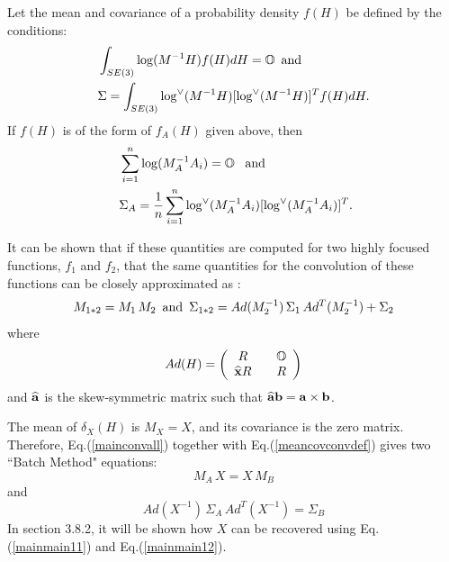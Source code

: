 \documentclass[twocolumn,10pt]{asme2ej}
\begin{document}
Let the mean and covariance of a probability density $f(H)$ be defined by the conditions:
\begin{equation} \begin{split} &\int_{SE(3)} \log(M^{-1} H) f(H) dH = \mathbb{O} \,\,\, {\rm and} \,\,\,\\ &\Sigma = \int_{SE(3)} \log^{\vee}(M^{-1} H) [\log^{\vee}(M^{-1} H)]^T  f(H) dH . \end{split}\label{meancovdef} \end{equation}
If $f(H)$ is of the form of $f_A(H)$ given above, then
\begin{equation} \
\begin{split} &\sum_{i=1}^{n} \log(M_A^{-1} A_i) = \mathbb{O} {\rm \,\,\,\,\, and} \\
&\Sigma_A = \frac{1}{n} \sum_{i=1}^{n} \log^{\vee}(M_A^{-1} A_i) [\log^{\vee}(M_A^{-1} A_i)]^T.  \label{datameancovconvdef} \end{split}
\end{equation}

It can be shown that if these quantities are computed for two highly focused functions, $f_1$ and $f_2$, that the same quantities for
the convolution of these functions can be closely approximated as \cite{Wang08}:
\begin{equation}
M_{1*2} = M_1 \, M_2 \,\,\, {\rm and} \,\,\, \Sigma_{1*2} = Ad(M_2^{-1}) \,\Sigma_{1}\, Ad^T(M_2^{-1}) + \Sigma_{2}
\label{meancovconvdef} \end{equation}
where
\begin{equation} 
Ad(H) = \left(\begin{array}{ccc}
R && \mathbb{O} \\
\widehat{{\bf x}} R && R \end{array}\right) 
\label{adjdef} \end{equation}
and $\widehat{{\bf a}}$ is the skew-symmetric matrix such that $\widehat{{\bf a}} {\bf b} = {\bf a} \times {\bf b}$.

The mean of $\delta_X(H)$ is $M_X = X$, and its covariance is the zero matrix.
Therefore, Eq.(\ref{mainconvall}) together with Eq.(\ref{meancovconvdef}) gives two ``Batch Method" equations:
\begin{equation}
\boxed{\,
M_A \, X = X \, M_B
\,}
\label{mainmain11} \end{equation}
and
\begin{equation}
\boxed{\,
Ad(X^{-1}) \, \Sigma_{A} \, Ad^T(X^{-1}) = \Sigma_{B}
\,}
\label{mainmain12} \end{equation}
In section 3.8.2, it will be shown how $X$ can be recovered using Eq.(\ref{mainmain11}) and Eq.(\ref{mainmain12}).
\end{document}
